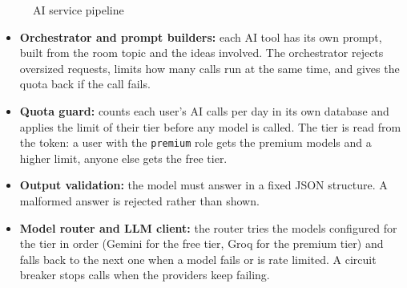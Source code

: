 \documentclass[12pt,a4paper]{report}
\begin{document}
\begin{figure}[htbp]
\centering
{}\relax
{}
\caption{AI service pipeline}
\label{fig:arch-ai}
\end{figure}

\begin{itemize}
  \item \textbf{Orchestrator and prompt builders:} each AI tool has its own prompt, built from the room topic and the ideas involved. The orchestrator rejects oversized requests, limits how many calls run at the same time, and gives the quota back if the call fails.
  \item \textbf{Quota guard:} counts each user's AI calls per day in its own database and applies the limit of their tier before any model is called. The tier is read from the token: a user with the \texttt{premium} role gets the premium models and a higher limit, anyone else gets the free tier.
  \item \textbf{Output validation:} the model must answer in a fixed JSON structure. A malformed answer is rejected rather than shown.
  \item \textbf{Model router and LLM client:} the router tries the models configured for the tier in order (Gemini for the free tier, Groq for the premium tier) and falls back to the next one when a model fails or is rate limited. A circuit breaker stops calls when the providers keep failing.
\end{itemize}
\end{document}
